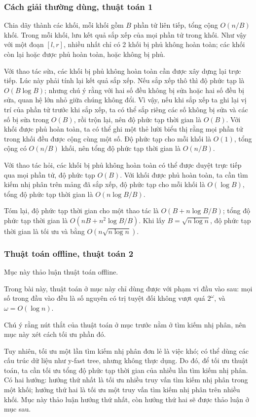 \documentclass[11pt]{article}
\begin{document}
\subsubsection{Cách giải thường dùng, thuật toán 1}

Chia dãy thành các khối, mỗi khối gồm $B$ phần tử liên tiếp, tổng cộng
$O(n/B)$ khối. Trong mỗi khối, lưu kết quả sắp xếp của mọi phần tử trong khối.
Như vậy với một đoạn $[l,r]$, nhiều nhất chỉ có 2 khối bị phủ không hoàn toàn;
các khối còn lại hoặc được phủ hoàn toàn, hoặc không bị phủ.

Với thao tác sửa, các khối bị phủ không hoàn toàn cần được xây dựng lại trực
tiếp. Lúc này phải tính lại kết quả sắp xếp. Nếu sắp xếp thô thì độ phức tạp
là $O(B\log B)$; nhưng chú ý rằng với hai số đều không bị sửa hoặc hai số đều
bị sửa, quan hệ lớn nhỏ giữa chúng không đổi. Vì vậy, nếu khi sắp xếp ta ghi
lại vị trí của phần tử trước khi sắp xếp, ta có thể sắp riêng các số không bị
sửa và các số bị sửa trong $O(B)$, rồi trộn lại, nên độ phức tạp thời gian là
$O(B)$. Với khối được phủ hoàn toàn, ta có thể ghi một thẻ lười biểu thị rằng
mọi phần tử trong khối đều được cộng cùng một số. Độ phức tạp cho mỗi khối là
$O(1)$, tổng cộng có $O(n/B)$ khối, nên tổng độ phức tạp thời gian là $O(n/B)$.

Với thao tác hỏi, các khối bị phủ không hoàn toàn có thể được duyệt trực tiếp
qua mọi phần tử, độ phức tạp $O(B)$. Với khối được phủ hoàn toàn, ta cần tìm
kiếm nhị phân trên mảng đã sắp xếp, độ phức tạp cho mỗi khối là $O(\log B)$,
tổng độ phức tạp thời gian là $O(n\log B/B)$.

Tóm lại, độ phức tạp thời gian cho một thao tác là
$O(B+n\log B/B)$; tổng độ phức tạp thời gian là
$O(nB+n^2\log B/B)$. Khi lấy $B=\sqrt{n\log n}$, độ phức tạp thời gian là tối
ưu và bằng $O(n\sqrt{n\log n})$.

\subsubsection{Thuật toán offline, thuật toán 2}

Mục này thảo luận thuật toán offline.

Trong bài này, thuật toán ở mục này chỉ dùng được với phạm vi đầu vào sau: mọi
số trong đầu vào đều là số nguyên có trị tuyệt đối không vượt quá $2^\omega$,
và $\omega=O(\log n)$.

Chú ý rằng nút thắt của thuật toán ở mục trước nằm ở tìm kiếm nhị phân, nên mục
này xét cách tối ưu phần đó.

Tuy nhiên, tối ưu một lần tìm kiếm nhị phân đơn lẻ là việc khó; có thể dùng các
cấu trúc dữ liệu như y-fast tree, nhưng không thực dụng. Do đó, để tối ưu thuật
toán, ta cần tối ưu tổng độ phức tạp thời gian của nhiều lần tìm kiếm nhị phân.
Có hai hướng: hướng thứ nhất là tối ưu nhiều truy vấn tìm kiếm nhị phân trong
một khối; hướng thứ hai là tối ưu một truy vấn tìm kiếm nhị phân trên nhiều
khối. Mục này thảo luận hướng thứ nhất, còn hướng thứ hai sẽ được thảo luận ở
mục sau.
\end{document}
